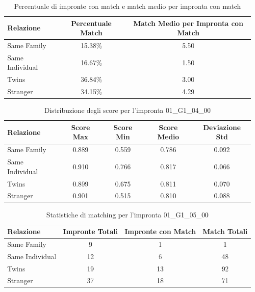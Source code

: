 \begin{table}[htbp]
\centering
\caption{Percentuale di impronte con match e match medio per impronta con match}
\label{tab:match_percentage_01_G1_04_00}
\begin{tabular}{|l|c|c|}
\hline
\textbf{Relazione} & \textbf{Percentuale Match} & \textbf{Match Medio per Impronta con Match} \\
\hline
Same Family & 15.38\% & 5.50 \\
\hline
Same Individual & 16.67\% & 1.50 \\
\hline
Twins & 36.84\% & 3.00 \\
\hline
Stranger & 34.15\% & 4.29 \\
\hline
\end{tabular}
\end{table}


\begin{table}[htbp]
\centering
\caption{Distribuzione degli score per l'impronta 01\_G1\_04\_00}
\label{tab:scores_01_G1_04_00}
\begin{tabular}{|l|c|c|c|c|}
\hline
\textbf{Relazione} & \textbf{Score Max} & \textbf{Score Min} & \textbf{Score Medio} & \textbf{Deviazione Std} \\
\hline
Same Family & 0.889 & 0.559 & 0.786 & 0.092 \\
\hline
Same Individual & 0.910 & 0.766 & 0.817 & 0.066 \\
\hline
Twins & 0.899 & 0.675 & 0.811 & 0.070 \\
\hline
Stranger & 0.901 & 0.515 & 0.810 & 0.088 \\
\hline
\end{tabular}
\end{table}


\begin{table}[htbp]
\centering
\caption{Statistiche di matching per l'impronta 01\_G1\_05\_00}
\label{tab:results_01_G1_05_00}
\begin{tabular}{|l|c|c|c|}
\hline
\textbf{Relazione} & \textbf{Impronte Totali} & \textbf{Impronte con Match} & \textbf{Match Totali} \\
\hline
Same Family & 9 & 1 & 1 \\
\hline
Same Individual & 12 & 6 & 48 \\
\hline
Twins & 19 & 13 & 92 \\
\hline
Stranger & 37 & 18 & 71 \\
\hline
\end{tabular}
\end{table}


